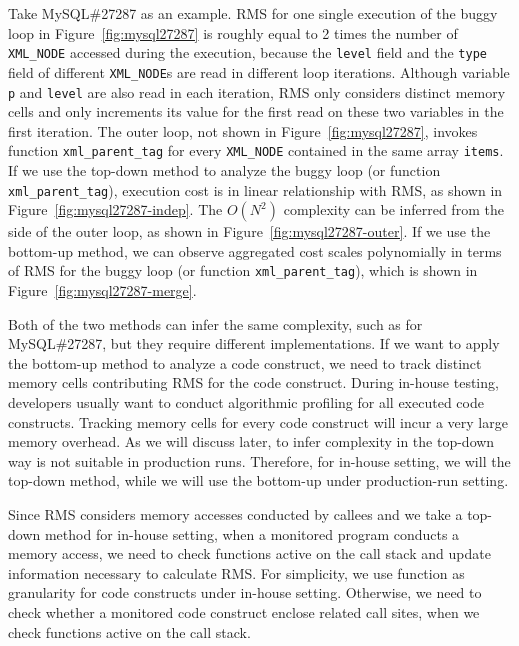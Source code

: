 Take MySQL\#27287 as an example.
RMS for one single execution of
the buggy loop in Figure~\ref{fig:mysql27287}
is roughly equal to 2 times the number of \texttt{XML\_NODE} 
accessed during the execution, 
because the \texttt{level} field and the \texttt{type} field of 
different \texttt{XML\_NODE}s are read in different loop iterations.
Although variable \texttt{p} and \texttt{level} are also read in each iteration,
RMS only considers distinct memory cells and 
only increments its value for the first read on these two variables in the first iteration. 
The outer loop, not shown in Figure~\ref{fig:mysql27287}, 
invokes function \texttt{xml\_parent\_tag} for every \texttt{XML\_NODE} contained
in the same array \texttt{items}.
If we use the top-down method to analyze the buggy loop
(or function \texttt{xml\_parent\_tag}), 
execution cost is in linear relationship with RMS, 
as shown in Figure~\ref{fig:mysql27287-indep}.
The $O(N^2)$ complexity can be inferred from the side of the outer loop, 
as shown in Figure~\ref{fig:mysql27287-outer}. 
If we use the bottom-up method, 
we can observe aggregated cost scales 
polynomially in terms of RMS for the buggy loop 
(or function \texttt{xml\_parent\_tag}), 
which is shown in Figure~\ref{fig:mysql27287-merge}. 


Both of the two methods can infer the same complexity, such as for MySQL\#27287,
but they require different implementations.
If we want to apply the bottom-up method to analyze a code construct,
we need to track distinct memory cells contributing RMS for the code construct.
During in-house testing, developers usually want to conduct algorithmic profiling 
for all executed code constructs. 
Tracking memory cells for every code construct will 
incur a very large memory overhead.  
As we will discuss later, to infer complexity in the top-down way 
is not suitable in production runs. 
Therefore, for in-house setting, we will the top-down method, 
while we will use the bottom-up under production-run setting. 

Since RMS considers memory accesses conducted by callees 
and we take a top-down method for in-house setting,
when a monitored program conducts a memory access,
we need to check functions active on the call stack and 
update information necessary to calculate RMS. 
For simplicity, we use function as granularity for code constructs under in-house setting.
Otherwise, we need to check whether a monitored code construct enclose related call sites, 
when we check functions active on the call stack.  

